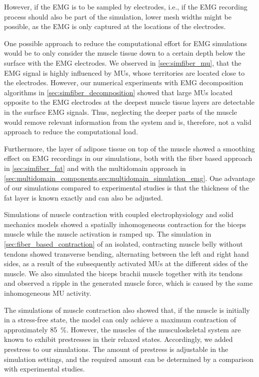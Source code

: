 However, if the EMG is to be sampled by electrodes, i.e., if the EMG recording process should also be part of the simulation, lower mesh widths might be possible, as the EMG is only captured at the locations of the electrodes.

One possible approach to reduce the computational effort for EMG simulations would be to only consider the muscle tissue down to a certain depth below the surface with the EMG electrodes. We observed in \cref{sec:simfiber_mu}, that the EMG signal is highly influenced by MUs, whose territories are located close to the electrodes. However, our numerical experiments with EMG decomposition algorithms in \cref{sec:simfiber_decomposition} showed that large MUs located opposite to the EMG electrodes at the deepest muscle tissue layers are detectable in the surface EMG signals. Thus, neglecting the deeper parts of the muscle would remove relevant information from the system and is, therefore, not a valid approach to reduce the computational load.

Furthermore, the layer of adipose tissue on top of the muscle showed a smoothing effect on EMG recordings in our simulations, both with the fiber based approach in \cref{sec:simfiber_fat} and with the multidomain approach in \cref{sec:multidomain_components,sec:multidomain_simulation_emg}. One advantage of our simulations compared to experimental studies is that the thickness of the fat layer is known exactly and can also be adjusted.

Simulations of muscle contraction with coupled electrophysiology and solid mechanics models showed a spatially inhomogeneous contraction  for the biceps muscle while the muscle activation is ramped up. The simulation in \cref{sec:fiber_based_contraction} of an isolated, contracting muscle belly without tendons showed transverse bending, alternating between the left and right hand sides, as a result of the subsequently activated MUs at the different sides of the muscle. We also simulated the biceps brachii muscle together with its tendons and observed a ripple in the generated muscle force, which is caused by the same inhomogeneous MU activity.

The simulations of muscle contraction also showed that, if the muscle is initially in a stress-free state, the model can only achieve a maximum contraction of approximately \SI{85}{\percent}. However, the muscles of the musculoskeletal system are known to exhibit prestresses in their relaxed states. Accordingly, we added prestress to our simulations. The amount of prestress is adjustable in the simulation settings, and the required amount can be determined by a comparison with experimental studies.

